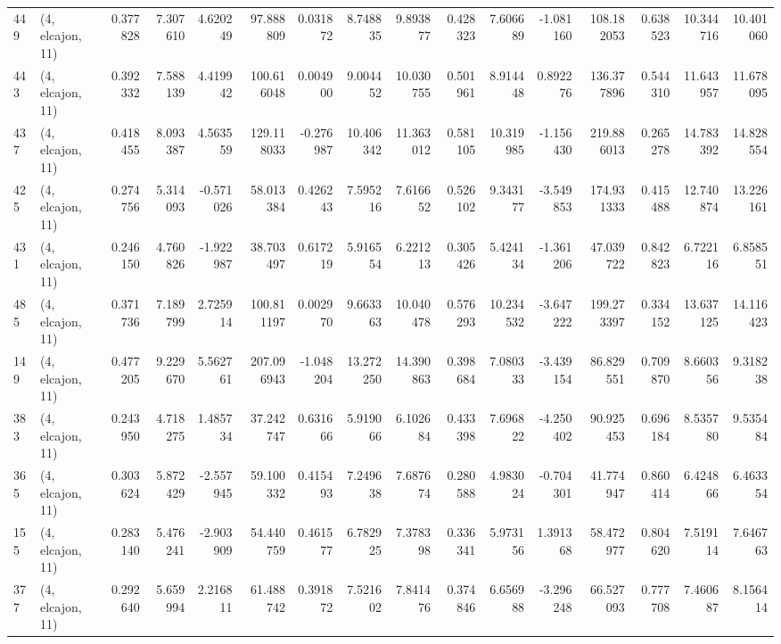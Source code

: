 \begin{tabular}{llrrrrrrrrrrrrrr}
449 &  (4, elcajon, 11) &   0.377828 &   7.307610 &   4.620249 &    97.888809 &   0.031872 &   8.748835 &   9.893877 &  0.428323 &   7.606689 &  -1.081160 &   108.182053 &   0.638523 &  10.344716 &  10.401060 \\
443 &  (4, elcajon, 11) &   0.392332 &   7.588139 &   4.419942 &   100.616048 &   0.004900 &   9.004452 &  10.030755 &  0.501961 &   8.914448 &   0.892276 &   136.377896 &   0.544310 &  11.643957 &  11.678095 \\
437 &  (4, elcajon, 11) &   0.418455 &   8.093387 &   4.563559 &   129.118033 &  -0.276987 &  10.406342 &  11.363012 &  0.581105 &  10.319985 &  -1.156430 &   219.886013 &   0.265278 &  14.783392 &  14.828554 \\
425 &  (4, elcajon, 11) &   0.274756 &   5.314093 &  -0.571026 &    58.013384 &   0.426243 &   7.595216 &   7.616652 &  0.526102 &   9.343177 &  -3.549853 &   174.931333 &   0.415488 &  12.740874 &  13.226161 \\
431 &  (4, elcajon, 11) &   0.246150 &   4.760826 &  -1.922987 &    38.703497 &   0.617219 &   5.916554 &   6.221213 &  0.305426 &   5.424134 &  -1.361206 &    47.039722 &   0.842823 &   6.722116 &   6.858551 \\
485 &  (4, elcajon, 11) &   0.371736 &   7.189799 &   2.725914 &   100.811197 &   0.002970 &   9.663363 &  10.040478 &  0.576293 &  10.234532 &  -3.647222 &   199.273397 &   0.334152 &  13.637125 &  14.116423 \\
149 &  (4, elcajon, 11) &   0.477205 &   9.229670 &   5.562761 &   207.096943 &  -1.048204 &  13.272250 &  14.390863 &  0.398684 &   7.080333 &  -3.439154 &    86.829551 &   0.709870 &   8.660356 &   9.318238 \\
383 &  (4, elcajon, 11) &   0.243950 &   4.718275 &   1.485734 &    37.242747 &   0.631666 &   5.919066 &   6.102684 &  0.433398 &   7.696822 &  -4.250402 &    90.925453 &   0.696184 &   8.535780 &   9.535484 \\
365 &  (4, elcajon, 11) &   0.303624 &   5.872429 &  -2.557945 &    59.100332 &   0.415493 &   7.249638 &   7.687674 &  0.280588 &   4.983024 &  -0.704301 &    41.774947 &   0.860414 &   6.424866 &   6.463354 \\
155 &  (4, elcajon, 11) &   0.283140 &   5.476241 &  -2.903909 &    54.440759 &   0.461577 &   6.782925 &   7.378398 &  0.336341 &   5.973156 &   1.391368 &    58.472977 &   0.804620 &   7.519114 &   7.646763 \\
377 &  (4, elcajon, 11) &   0.292640 &   5.659994 &   2.216811 &    61.488742 &   0.391872 &   7.521602 &   7.841476 &  0.374846 &   6.656988 &  -3.296248 &    66.527093 &   0.777708 &   7.460687 &   8.156414 \\

\end{tabular}
